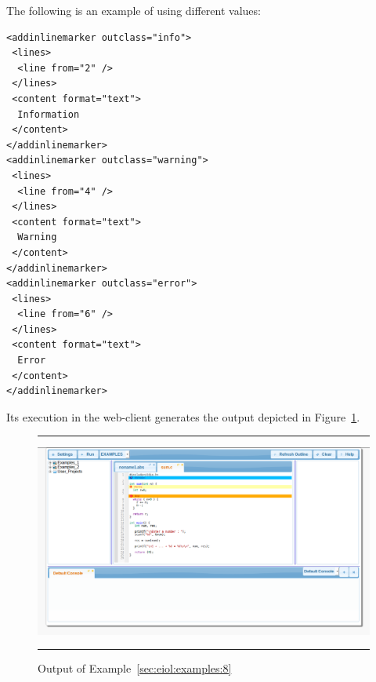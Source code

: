 \begin{example}
\label{sec:eiol:examples:8}
%
The following is an example of 
 using different
 values:

\medskip
\begin{lstlisting}
<addinlinemarker outclass="info">
 <lines>
  <line from="2" />
 </lines>
 <content format="text">
  Information
 </content>
</addinlinemarker>
<addinlinemarker outclass="warning">
 <lines>
  <line from="4" />
 </lines>
 <content format="text">
  Warning
 </content>
</addinlinemarker>
<addinlinemarker outclass="error">
 <lines>
  <line from="6" />
 </lines>
 <content format="text">
  Error
 </content>
</addinlinemarker>
\end{lstlisting}

\medskip
\noindent
Its execution in the web-client generates the output depicted in
Figure~\ref{fig:examples:8}.

\begin{figure}[h]
\hrule\smallskip
\begin{center}
\includegraphics[width=1\textwidth]{fig/example8.png}
\end{center}
\caption{Output of Example~\ref{sec:eiol:examples:8}}
\label{fig:examples:8}
\hrule
\end{figure}
\end{example}

